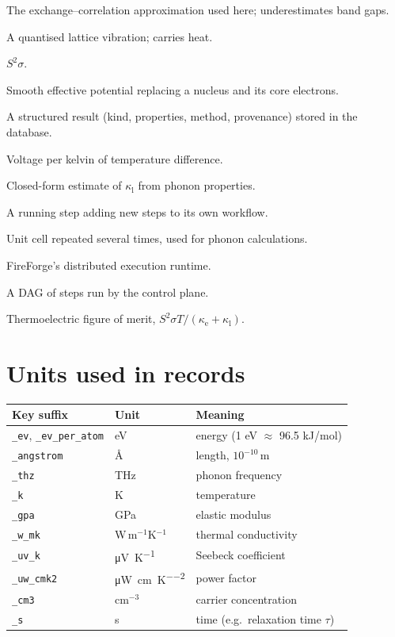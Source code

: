 \documentclass[11pt,a4paper]{report}
\newcommand{\code}[1]{\texttt{#1}}
\newcommand{\kl}{\kappa_\mathrm{l}}
\newcommand{\ke}{\kappa_\mathrm{e}}
\begin{document}
\begin{description}[style=nextline,leftmargin=1.2cm]
\item[PBE] The exchange--correlation approximation used here; underestimates band gaps.
\item[Phonon] A quantised lattice vibration; carries heat.
\item[Power factor] $S^2\sigma$.
\item[Pseudopotential] Smooth effective potential replacing a nucleus and its core electrons.
\item[Record] A structured result (kind, properties, method, provenance) stored in the database.
\item[Seebeck coefficient $S$] Voltage per kelvin of temperature difference.
\item[Slack model] Closed-form estimate of $\kl$ from phonon properties.
\item[Spawn] A running step adding new steps to its own workflow.
\item[Supercell] Unit cell repeated several times, used for phonon calculations.
\item[TDR] FireForge's distributed execution runtime.
\item[Workflow] A DAG of steps run by the control plane.
\item[$ZT$] Thermoelectric figure of merit, $S^2\sigma T/(\ke+\kl)$.
\end{description}

\chapter{Units used in records}

\begin{center}
\small
\begin{tabular}{lll}
\toprule
Key suffix & Unit & Meaning \\
\midrule
\code{\_ev}, \code{\_ev\_per\_atom} & eV & energy (1 eV $\approx$ 96.5 kJ/mol) \\
\code{\_angstrom} & \AA & length, $10^{-10}$\,m \\
\code{\_thz} & THz & phonon frequency \\
\code{\_k} & K & temperature \\
\code{\_gpa} & GPa & elastic modulus \\
\code{\_w\_mk} & W\,m$^{-1}$K$^{-1}$ & thermal conductivity \\
\code{\_uv\_k} & \si{\micro\volt\per\kelvin} & Seebeck coefficient \\
\code{\_uw\_cmk2} & \si{\micro\watt\per\centi\metre\per\kelvin\squared} & power factor \\
\code{\_cm3} & cm$^{-3}$ & carrier concentration \\
\code{\_s} & s & time (e.g.\ relaxation time $\tau$) \\
\bottomrule
\end{tabular}
\end{center}
\end{document}
